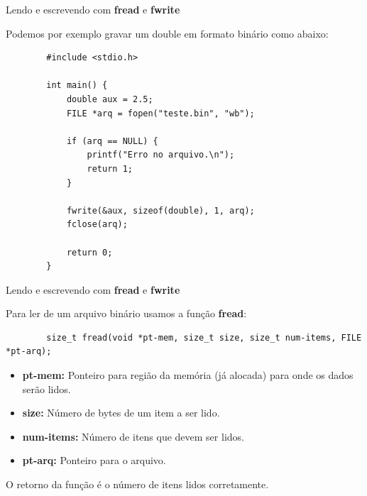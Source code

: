\documentclass[handout]{beamer}
\begin{document}
\begin{frame}[fragile]{Lendo e escrevendo com \textbf{fread} e \textbf{fwrite}}

    Podemos por exemplo gravar um double em formato binário como abaixo:

    \begin{verbatim}
        #include <stdio.h>

        int main() {
            double aux = 2.5;
            FILE *arq = fopen("teste.bin", "wb");

            if (arq == NULL) {
                printf("Erro no arquivo.\n");
                return 1;
            }

            fwrite(&aux, sizeof(double), 1, arq);
            fclose(arq);

            return 0;
        }
    \end{verbatim}

\end{frame}

\begin{frame}[fragile]{Lendo e escrevendo com \textbf{fread} e \textbf{fwrite}}

    Para ler de um arquivo binário usamos a função \textbf{fread}:

    \begin{verbatim}
        size_t fread(void *pt-mem, size_t size, size_t num-items, FILE *pt-arq);
    \end{verbatim}

    \begin{itemize}
        \item \textbf{pt-mem:} Ponteiro para região da memória (já alocada) para onde
        os dados serão lidos.
        \item \textbf{size:} Número de bytes de um item a ser lido.
        \item \textbf{num-items:} Número de itens que devem ser lidos.
        \item \textbf{pt-arq:} Ponteiro para o arquivo.
    \end{itemize}

    O retorno da função é o número de itens lidos corretamente.

\end{frame}
\end{document}
